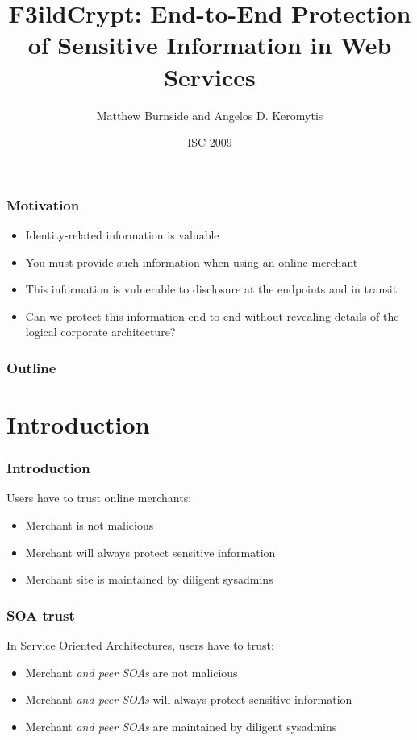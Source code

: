 \documentclass{beamer}
\title[F3ildCrypt]{F3ildCrypt: End-to-End Protection of Sensitive Information
in Web Services}
\author[Burnside, Keromytis]{Matthew Burnside and Angelos D. Keromytis}
\institute[Columbia University]{
Department of Computer Science\\
Columbia University\\
\texttt{\{mb, angelos\}@cs.columbia.edu}
}
\date{ISC 2009}
\begin{document}
\begin{frame}[plain]
    \titlepage
\end{frame}

\begin{frame}
\frametitle{Motivation}
\begin{itemize}
\item Identity-related information is valuable
\item You must provide such information when using an online merchant
\item This information is vulnerable to disclosure at the endpoints and in
transit 
\item Can we protect this information end-to-end without revealing details of
the logical corporate architecture?
\end{itemize}
\end{frame}

\begin{frame}
\frametitle{Outline}
\tableofcontents
\end{frame}

\section{Introduction}

\begin{frame}
\frametitle{Introduction}
Users have to trust online merchants:
\smallskip
\begin{itemize}
\item Merchant is not malicious
\item Merchant will always protect sensitive information
\item Merchant site is maintained by diligent sysadmins
\end{itemize}
\end{frame}

\begin{frame}
\frametitle{SOA trust}
In Service Oriented Architectures, users have to trust:
\smallskip
\begin{itemize}
\item Merchant \emph{and peer SOAs} are not malicious
\item Merchant \emph{and peer SOAs} will always protect sensitive information
\item Merchant \emph{and peer SOAs} are maintained by diligent sysadmins
\end{itemize}
\end{frame}
\end{document}
